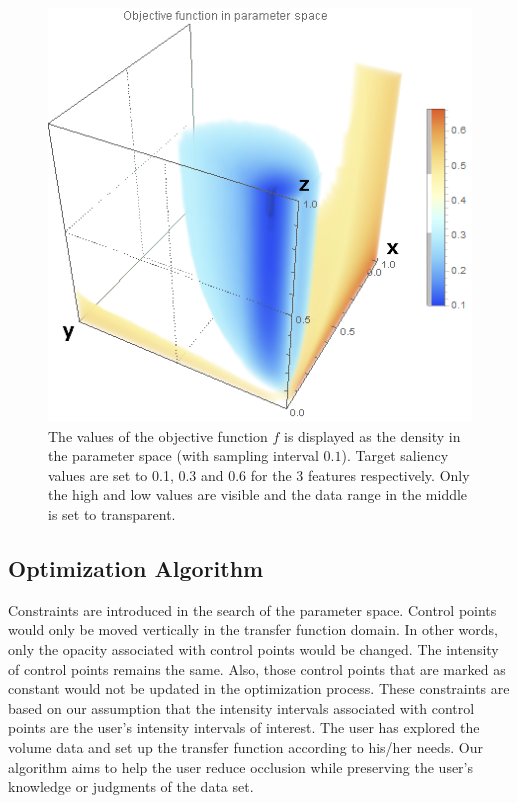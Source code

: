 \begin{figure}
	\centering
	\begin{minipage}{.6\textwidth}
		\includegraphics[width=1\linewidth]{images/parameterspace}
	\end{minipage}
	\caption{The values of the objective function $  f $ is displayed as the density in the parameter space (with sampling interval $ 0.1 $). Target saliency values are set to 0.1, 0.3 and 0.6 for the 3 features respectively. Only the high and low values are visible and the data range in the middle is set to transparent.}
	\label{fig:nucleon_parameterspace}
\end{figure}


\subsection{Optimization Algorithm}
Constraints are introduced in the search of the parameter space. Control points would only be moved vertically in the transfer function domain. In other words, only the opacity associated with control points would be changed. The intensity of control points remains the same. Also, those control points that are marked as constant would not be updated in the optimization process.
These constraints are based on our assumption that the intensity intervals associated with control points are the user's intensity intervals of interest. The user has explored the volume data and set up the transfer function according to his/her needs. Our algorithm aims to help the user reduce occlusion while preserving the user's knowledge or judgments of the data set.

